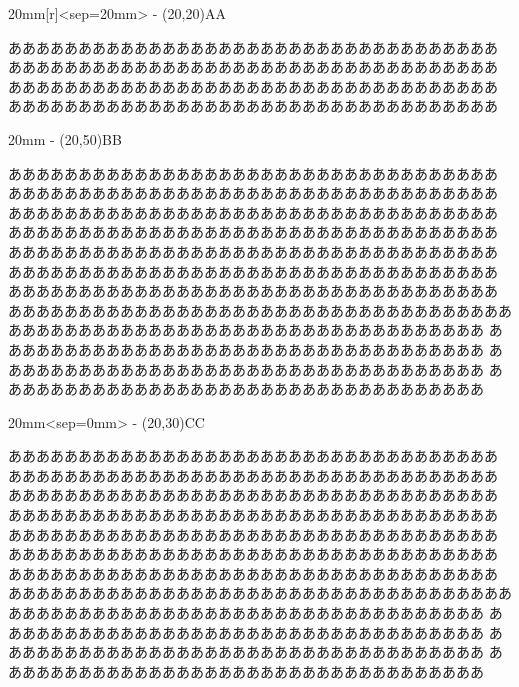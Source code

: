 \documentclass[twoside]{jarticle}
\begin{document}
\begin{kvwrapfigure}{20mm}[r]<sep=20mm>
\fboxsep-\fboxrule
\framebox(20,20){AA}
\end{kvwrapfigure}
あああああああああああああああああああああああああああああああああああ
あああああああああああああああああああああああああああああああああああ
あああああああああああああああああああああああああああああああああああ
あああああああああああああああああああああああああああああああああああ


\begin{kvwrapfigure}{20mm}
\fboxsep-\fboxrule
\framebox(20,50){BB}
\end{kvwrapfigure}
\the\wrapcolumnsep
あああああああああああああああああああああああああああああああああああ
あああああああああああああああああああああああああああああああああああ
あああああああああああああああああああああああああああああああああああ
あああああああああああああああああああああああああああああああああああ
あああああああああああああああああああああああああああああああああああ
あああああああああああああああああああああああああああああああああああ
あああああああああああああああああああああああああああああああああああ
ああああああああああああああああああああああああああああああああああああああああああああああああああああああああああああああああああああああ
あああああああああああああああああああああああああああああああああああ
あああああああああああああああああああああああああああああああああああ
あああああああああああああああああああああああああああああああああああ



\makeatletter
\begin{kvwrapfigure}{20mm}<sep=0mm>
\fboxsep-\fboxrule
\framebox(20,30){CC}
\end{kvwrapfigure}
あああああああああああああああああああああああああああああああああああ
あああああああああああああああああああああああああああああああああああ
あああああああああああああああああああああああああああああああああああ
あああああああああああああああああああああああああああああああああああ
あああああああああああああああああああああああああああああああああああ
あああああああああああああああああああああああああああああああああああ
あああああああああああああああああああああああああああああああああああ
ああああああああああああああああああああああああああああああああああああああああああああああああああああああああああああああああああああああ
あああああああああああああああああああああああああああああああああああ
あああああああああああああああああああああああああああああああああああ
あああああああああああああああああああああああああああああああああああ
\end{document}
